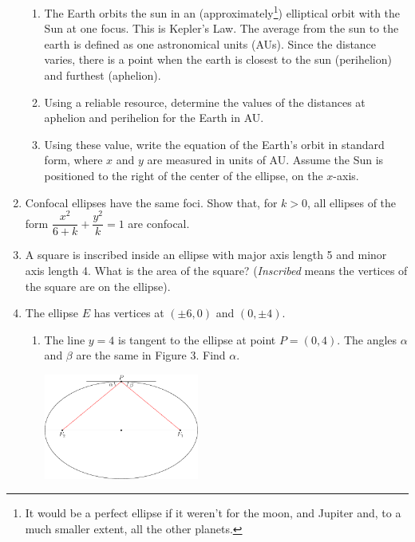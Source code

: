 \documentclass[11pt]{article}
\begin{document}
\begin{enumerate}
\begin{enumerate}
  \item
    The Earth orbits the sun in an (approximately\footnote{It would be a
      perfect ellipse if it weren't for the moon, and Jupiter and, to a
      much smaller extent, all the other planets.}) elliptical orbit
    with the Sun at one focus. This is Kepler's Law. The average from
    the sun to the earth is defined as one astronomical units (AUs).
    Since the distance varies, there is a point when the earth is
    closest to the sun (perihelion) and furthest (aphelion).
  \item
    Using a reliable resource, determine the values of the distances at
    aphelion and perihelion for the Earth in AU.
  \item
    Using these value, write the equation of the Earth's orbit in
    standard form, where \(x\) and \(y\) are measured in units of AU.
    Assume the Sun is positioned to the right of the center of the
    ellipse, on the \(x\)-axis.
  \end{enumerate}
\item
  Confocal ellipses have the same foci. Show that, for \(k>0\), all
  ellipses of the form \(\dfrac{x^2}{6+k}+\dfrac{y^2}{k}=1\) are
  confocal.
\item
  A square is inscribed inside an ellipse with major axis length 5 and
  minor axis length 4. What is the area of the square? (\emph{Inscribed}
  means the vertices of the square are on the ellipse).
\item
	The ellipse \(E\) has vertices at \((\pm 6,0)\) and \((0, \pm 4)\).

	\begin{enumerate}
	\item
  The line \(y=4\) is tangent to the ellipse at point \(P = (0,4)\). The
  angles \(\alpha\) and \(\beta\) are the same in Figure 3. Find
  \(\alpha\). \\
	\begin{center}
		\includegraphics*[width=2in]{ellipse2.pdf}
	\end{center}


\end{enumerate}
\end{enumerate}
\end{document}

